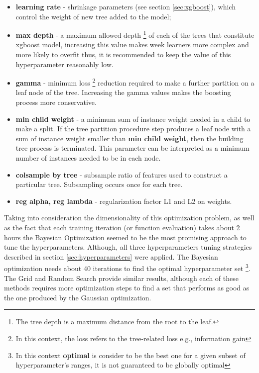 \begin{itemize}
    \item \textbf{learning rate} - shrinkage parameters (see section \ref{sec:xgboost}), which control the weight of new tree added to the model;    
    \item \textbf{max depth} - a maximum allowed depth \footnote{The tree depth is a maximum distance from the root to the leaf.} of each of the trees that constitute xgboost model, increasing this value makes week learners more complex and more likely to overfit thus, it is recommended to keep the value of this hyperparameter reasonably low. 
    \item \textbf{gamma} - minimum loss \footnote{In this context, the loss refers to the tree-related loss e.g., information gain} reduction required to make a further partition on a leaf node of the tree. Increasing the gamma values makes the boosting process more conservative. 
    \item \textbf{min child weight} - a minimum sum of instance weight needed in a child to make a split. If the tree partition procedure step produces a leaf node with a sum of instance weight smaller than \textbf{min child weight}, then the building tree process is terminated. This parameter can be interpreted as a minimum number of instances needed to be in each node.
    \item \textbf{colsample by tree} - subsample ratio of features used to construct a particular tree. Subsampling occurs once for each tree. 
    \item \textbf{reg alpha, reg lambda} - regularization factor L1 and L2 on weights.      
    
\end{itemize}

Taking into consideration the dimensionality of this optimization problem, as well as the fact that each training iteration (or function evaluation) takes about 2 hours the Bayesian Optimization seemed to be the most promising approach to tune the hyperparameters. Although, all three hyperparameters tuning strategies described in section \ref{sec:hyperparameters} were applied. The Bayesian optimization needs about 40 iterations to find the optimal hyperparameter set \footnote{In this context \textbf{optimal} is consider to be the best one for a given subset of hyperparameter's ranges, it is not guaranteed to be globally optimal}. The Grid and Random Search provide similar results, although each of these methods requires more optimization steps to find a set that performs as good as the one produced by the Gaussian optimization. 

